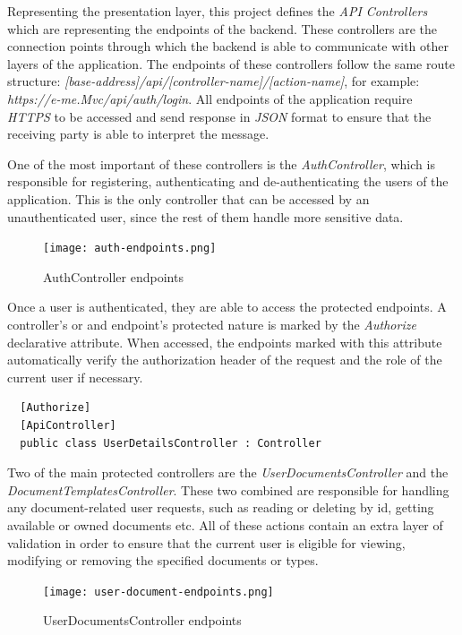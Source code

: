 Representing the presentation layer, this project defines the \emph{API Controllers} which are representing the endpoints of the backend.
These controllers are the connection points through which the backend is able to communicate with other layers of the application.
The endpoints of these controllers follow the same route structure: \emph{[base-address]/api/[controller-name]/[action-name]},
for example: \emph{https://e-me.Mvc/api/auth/login}.
All endpoints of the application require \emph{HTTPS} to be accessed and send response in \emph{JSON} format to ensure that the receiving
party is able to interpret the message.

One of the most important of these controllers is the \emph{AuthController}, which is responsible for 
registering, authenticating and de-authenticating the users of the application.
This is the only controller that can be accessed by an unauthenticated user, since the rest of them handle more 
sensitive data.


\begin{figure}[H]
	\centering
	\texttt{[image: auth-endpoints.png]}
	\caption{AuthController endpoints}
\end{figure}

Once a user is authenticated, they are able to access the protected endpoints.
A controller's or and endpoint's protected nature is marked by the \emph{Authorize} declarative attribute.
When accessed, the endpoints marked with this attribute automatically verify the authorization header of the request and the role of the current user if necessary.

\begin{lstlisting}
  [Authorize]
  [ApiController]
  public class UserDetailsController : Controller
\end{lstlisting}

Two of the main protected controllers are the \emph{UserDocumentsController} and the \emph{DocumentTemplatesController}.
These two combined are responsible for handling any document-related user requests, such as reading or deleting by id, getting available or owned documents etc. 
All of these actions contain an extra layer of validation in order to ensure that the current user is eligible for viewing, modifying or removing 
the specified documents or types. 

\begin{figure}[H]
	\centering
	\texttt{[image: user-document-endpoints.png]}
	\caption{UserDocumentsController endpoints}
\end{figure}

